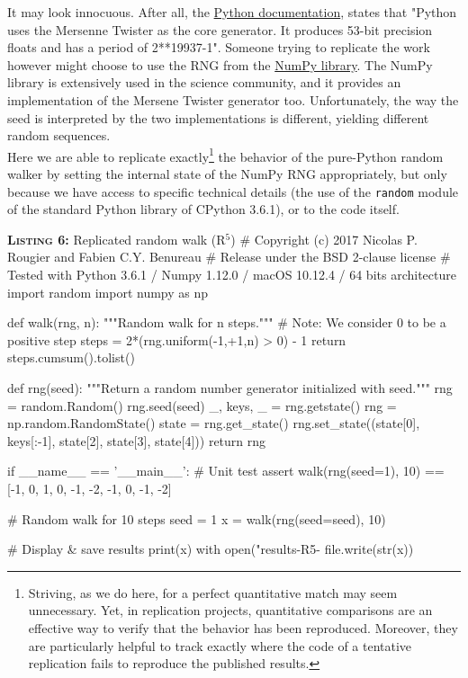 \documentclass[a4paper,11pt]{article}
\begin{document}
It may look innocuous. After all, the
\href{https://docs.python.org/3.6/library/random.html}{Python documentation},
states that "Python uses the Mersenne Twister as the core generator. It produces
53-bit precision floats and has a period of 2**19937-1". Someone trying to replicate the work however might choose to use the RNG from the \href{http://www.numpy.org/}{NumPy library}.  The NumPy library is extensively used in the science community, and it provides an implementation of the Mersene Twister generator too. Unfortunately, the way the seed is interpreted by the two implementations is different, yielding different random sequences.\\

Here we are able to replicate exactly\footnote{Striving, as we do here, for a perfect quantitative match may seem unnecessary. Yet, in replication projects, quantitative comparisons are an effective way to verify that the behavior has been reproduced. Moreover, they are particularly helpful to track exactly where the code of a tentative replication fails to reproduce the published results.} the behavior of the pure-Python random walker by setting the internal state of the NumPy RNG appropriately, but only because we have access to specific technical details (the use of the {\tt random} module of the standard Python library of CPython 3.6.1), or to the code itself.\\

\noindent \begin{minipage}[c]{\linewidth}
\begin{code}{\textbf{\textsc{Listing 6:}} Replicated random walk (R$^5$)}
# Copyright (c) 2017 Nicolas P. Rougier and Fabien C.Y. Benureau
# Release under the BSD 2-clause license
# Tested with Python 3.6.1 / Numpy 1.12.0 / macOS 10.12.4 / 64 bits architecture
import random
import numpy as np

def walk(rng, n):
    """Random walk for n steps."""
    # Note: We consider 0 to be a positive step
    steps = 2*(rng.uniform(-1,+1,n) > 0) - 1
    return steps.cumsum().tolist()

def rng(seed):
    """Return a random number generator initialized with seed."""
    rng = random.Random()
    rng.seed(seed)
    _, keys, _ = rng.getstate()
    rng = np.random.RandomState()
    state = rng.get_state()
    rng.set_state((state[0], keys[:-1], state[2], state[3], state[4]))
    return rng

if __name__ == '__main__':
    # Unit test
    assert walk(rng(seed=1), 10) == [-1, 0, 1, 0, -1, -2, -1, 0, -1, -2]

    # Random walk for 10 steps
    seed = 1
    x = walk(rng(seed=seed), 10)

    # Display & save results
    print(x)
    with open("results-R5-%
        file.write(str(x))
\end{code}
\end{minipage}
\end{document}
